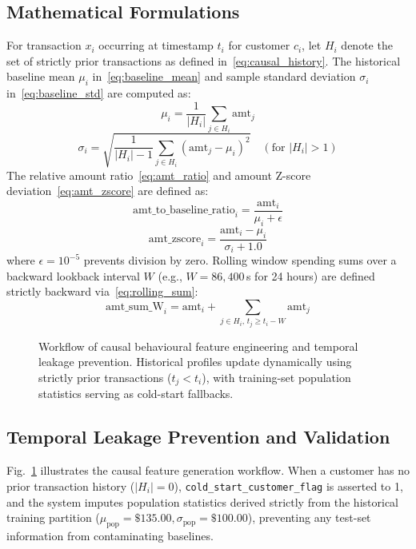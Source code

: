 \documentclass[conference]{IEEEtran}
\begin{document}
\subsection{Mathematical Formulations}
For transaction $x_i$ occurring at timestamp $t_i$ for customer $c_i$, let $H_i$ denote the set of strictly prior transactions as defined in~\eqref{eq:causal_history}. The historical baseline mean $\mu_i$ in~\eqref{eq:baseline_mean} and sample standard deviation $\sigma_i$ in~\eqref{eq:baseline_std} are computed as:
\begin{equation}
\mu_i = \frac{1}{|H_i|} \sum_{j \in H_i} \text{amt}_j
\label{eq:baseline_mean}
\end{equation}
\begin{equation}
\sigma_i = \sqrt{\frac{1}{|H_i| - 1} \sum_{j \in H_i} (\text{amt}_j - \mu_i)^2} \quad (\text{for } |H_i| > 1)
\label{eq:baseline_std}
\end{equation}
The relative amount ratio~\eqref{eq:amt_ratio} and amount Z-score deviation~\eqref{eq:amt_zscore} are defined as:
\begin{equation}
\text{amt\_to\_baseline\_ratio}_i = \frac{\text{amt}_i}{\mu_i + \epsilon}
\label{eq:amt_ratio}
\end{equation}
\begin{equation}
\text{amt\_zscore}_i = \frac{\text{amt}_i - \mu_i}{\sigma_i + 1.0}
\label{eq:amt_zscore}
\end{equation}
where $\epsilon = 10^{-5}$ prevents division by zero. Rolling window spending sums over a backward lookback interval $W$ (e.g., $W = 86,400$\,s for 24 hours) are defined strictly backward via~\eqref{eq:rolling_sum}:
\begin{equation}
\text{amt\_sum\_W}_i = \text{amt}_i + \sum_{j \in H_i, \, t_j \ge t_i - W} \text{amt}_j
\label{eq:rolling_sum}
\end{equation}

\begin{figure}[t]
\centering

\caption{Workflow of causal behavioural feature engineering and temporal leakage prevention. Historical profiles update dynamically using strictly prior transactions ($t_j < t_i$), with training-set population statistics serving as cold-start fallbacks.}
\label{fig:feature_pipeline}
\end{figure}

\subsection{Temporal Leakage Prevention and Validation}
Fig.~\ref{fig:feature_pipeline} illustrates the causal feature generation workflow. When a customer has no prior transaction history ($|H_i| = 0$), \texttt{cold\_start\_customer\_flag} is asserted to 1, and the system imputes population statistics derived strictly from the historical training partition ($\mu_{\text{pop}} = \$135.00, \sigma_{\text{pop}} = \$100.00$), preventing any test-set information from contaminating baselines.
\end{document}
